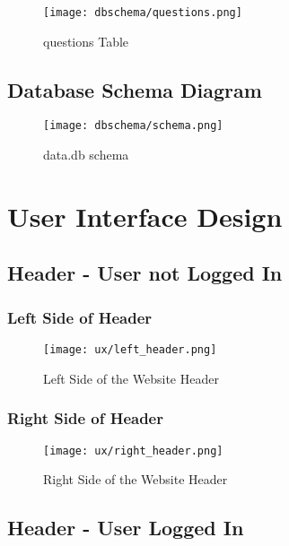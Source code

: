 \begin{figure}[H]
\begin{center}
\texttt{[image: dbschema/questions.png]}
\end{center}
\caption{questions Table}
\label{questions_table}
\end{figure}

\subsection{Database Schema Diagram}

\begin{figure}[H]
\hspace{-2cm} 
\texttt{[image: dbschema/schema.png]}
\caption{data.db schema}
\label{database_schema}
\end{figure}

\section{User Interface Design}

\subsection{Header - User not Logged In}

\subsubsection{Left Side of Header}
\begin{figure}[H]
\begin{center}
\texttt{[image: ux/left\_header.png]}
\end{center} 
\caption{Left Side of the Website Header}
\label{ux_left_header}
\end{figure}

\subsubsection{Right Side of Header}
\begin{figure}[H]
\begin{center}
\texttt{[image: ux/right\_header.png]}
\end{center} 
\caption{Right Side of the Website Header}
\label{ux_right_header}
\end{figure}

\subsection{Header - User Logged In}

